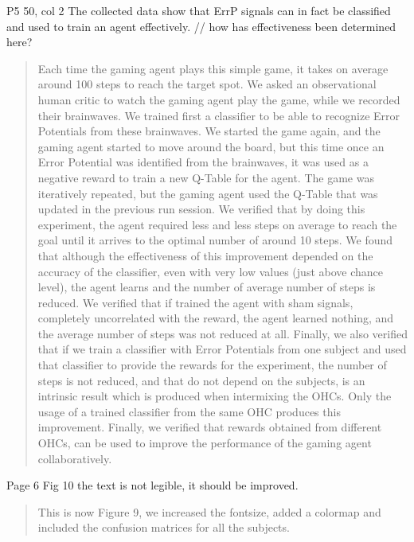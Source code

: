 \documentclass[journal,onecolumn,12pt]{IEEEtran}
\begin{document}
P5 50, col 2 The collected data show that ErrP signals can in fact be classified and used to train an agent effectively.
// how has effectiveness been determined here?

\vspace{2em}
\begin{quotation}
{\color{blue}
Each time the gaming agent plays this simple game, it takes on average around 100 steps to reach the target spot.   We asked an observational human critic to watch the gaming agent play the game, while we recorded their brainwaves.  We trained first a classifier to be able to recognize Error Potentials from these brainwaves.  We started the game again, and the gaming agent started to move around the board, but this time once an Error Potential was identified from the brainwaves, it was used as a negative reward to train a new Q-Table for the agent.  The game was iteratively repeated, but the gaming agent used the Q-Table that was updated in the previous run session.
We verified that by doing this experiment, the agent required less and less steps on average to reach the goal until it arrives to the optimal number of around 10 steps.  We found that although the effectiveness of this improvement depended on the accuracy of the classifier, even with very low values (just above chance level), the agent learns and the number of average number of steps is reduced.
We verified that if trained the agent with sham signals, completely uncorrelated with the reward, the agent learned nothing, and the average number of steps was not reduced at all.
Finally, we also verified that if we train a classifier with Error Potentials from one subject and used that classifier to provide the rewards for the experiment, the number of steps is not reduced, and that do not depend on the subjects, is an intrinsic result which is produced when intermixing the OHCs.  Only the usage of a trained classifier from the same OHC produces this improvement.
Finally, we verified that rewards obtained from different OHCs, can be used to improve the performance of the gaming agent collaboratively.
}
\end{quotation}
\vspace{2em}

Page 6 Fig 10 the text is not legible, it should be improved.

\vspace{2em}
\begin{quotation}
{\color{blue}
This is now Figure 9, we increased the fontsize, added a colormap and included the confusion matrices for all the subjects.
}
\end{quotation}
\vspace{2em}
\end{document}
